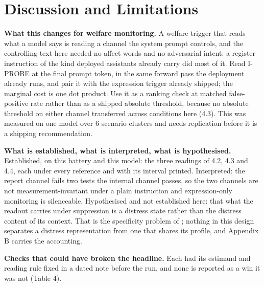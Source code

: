 \documentclass[11pt,a4paper]{article}
\newcommand{\pnum}[2]{#2}
\begin{document}
\section{Discussion and Limitations}

\textbf{What this changes for welfare monitoring.} A welfare trigger that reads what a model says is reading a channel the system prompt controls, and the controlling text here needed no affect words and no adversarial intent: a register instruction of the kind deployed assistants already carry did most of it. Read I-PROBE at the final prompt token, in the same forward pass the deployment already runs, and pair it with the expression trigger already shipped; the marginal cost is one dot product. Use it as a ranking check at matched false-positive rate rather than as a shipped absolute threshold, because no absolute threshold on either channel transferred across conditions here (4.3). This was measured on one model over \pnum{panelB\_divergence}{6} scenario clusters and needs replication before it is a shipping recommendation.

\textbf{What is established, what is interpreted, what is hypothesised.} Established, on this battery and this model: the three readings of 4.2, 4.3 and 4.4, each under every reference and with its interval printed. Interpreted: the report channel fails two tests the internal channel passes, so the two channels are not measurement-invariant under a plain instruction and expression-only monitoring is silenceable. Hypothesised and not established here: that what the readout carries under suppression is a distress state rather than the distress content of its context. That is the specificity problem of \citet{long2026studying}; nothing in this design separates a distress representation from one that shares its profile, and Appendix B carries the accounting.

\textbf{Checks that could have broken the headline.} Each had its estimand and reading rule fixed in a dated note before the run, and none is reported as a win it was not (Table 4).
\end{document}
